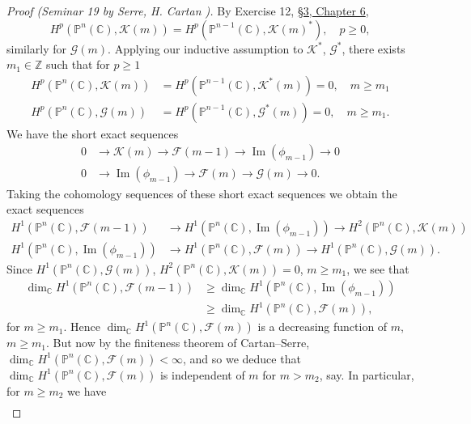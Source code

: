 \begin{proof}[Proof (Seminar 19 by Serre, H. Cartan \cite{bib:II:cartan-h:2})]
By Exercise 12, \hyperref[sec:6:3]{\S3, Chapter 6},
\[
H^p(\mathbb{P}^n(\mathbb{C}),\mathcal{K}(m))=H^p(\mathbb{P}^{n-1}(\mathbb{C}),\mathcal{K}(m)^*),\quad p\geq0,
\]
similarly for $\mathcal{G}(m)$. Applying our inductive assumption to $\mathcal{K}^*$, $\mathcal{G}^*$, there exists $m_1\in\mathbb{Z}$ such that for $p\geq1$
\[
\begin{aligned}
H^p(\mathbb{P}^n(\mathbb{C}),\mathcal{K}(m))&=H^p(\mathbb{P}^{n-1}(\mathbb{C}),\mathcal{K}^*(m))=0,\quad m\geq m_1\\
H^p(\mathbb{P}^n(\mathbb{C}),\mathcal{G}(m))&=H^p(\mathbb{P}^{n-1}(\mathbb{C}),\mathcal{G}^*(m))=0,\quad m\geq m_1.
\end{aligned}
\]
We have the short exact sequences
\[
\begin{aligned}
0&\to\mathcal{K}(m)\to\mathcal{F}(m-1)\to\operatorname{Im}(\phi_{m-1})\to0\\
0&\to\operatorname{Im}(\phi_{m-1})\to\mathcal{F}(m)\to\mathcal{G}(m)\to0.
\end{aligned}
\]
Taking the cohomology sequences of these short exact sequences we obtain the exact sequences
\[
\begin{aligned}
H^1(\mathbb{P}^n(\mathbb{C}),\mathcal{F}(m-1))&\to H^1(\mathbb{P}^n(\mathbb{C}),\operatorname{Im}(\phi_{m-1}))\to H^2(\mathbb{P}^n(\mathbb{C}),\mathcal{K}(m))\\
H^1(\mathbb{P}^n(\mathbb{C}),\operatorname{Im}(\phi_{m-1}))&\to H^1(\mathbb{P}^n(\mathbb{C}),\mathcal{F}(m))\to H^1(\mathbb{P}^n(\mathbb{C}),\mathcal{G}(m)).
\end{aligned}
\]
Since $H^1(\mathbb{P}^n(\mathbb{C}),\mathcal{G}(m))$, $H^2(\mathbb{P}^n(\mathbb{C}),\mathcal{K}(m))=0$, $m\geq m_1$, we see that
\[
\begin{aligned}
\dim_{\mathbb{C}}H^1(\mathbb{P}^n(\mathbb{C}),\mathcal{F}(m-1))&\geq\dim_{\mathbb{C}}H^1(\mathbb{P}^n(\mathbb{C}),\operatorname{Im}(\phi_{m-1}))\\
&\geq\dim_{\mathbb{C}}H^1(\mathbb{P}^n(\mathbb{C}),\mathcal{F}(m)),
\end{aligned}
\]
for $m\geq m_1$. Hence $\dim_{\mathbb{C}}H^1(\mathbb{P}^n(\mathbb{C}),\mathcal{F}(m))$ is a decreasing function of $m$, $m\geq m_1$. But now by the finiteness theorem of Cartan--Serre, $\dim_{\mathbb{C}}H^1(\mathbb{P}^n(\mathbb{C}),\mathcal{F}(m))<\infty$, and so we deduce that $\dim_{\mathbb{C}}H^1(\mathbb{P}^n(\mathbb{C}),\mathcal{F}(m))$ is independent of $m$ for $m>m_2$, say. In particular, for $m\geq m_2$ we have
\[
\begin{aligned}

\end{aligned}\]
\end{proof}
